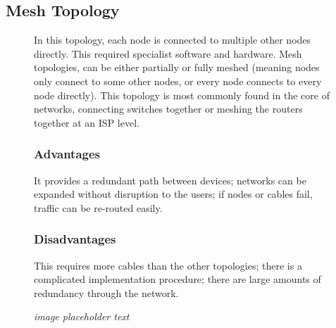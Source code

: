 \subsection*{Mesh Topology}
\begin{figure}[H]
    \begin{minipage}[H]{0.6\textwidth}
        In this topology, each node is connected to multiple other nodes directly. This required specialist software and hardware. Mesh topologies, can be either partially or fully meshed (meaning nodes only connect to some other nodes, or every node connects to every node directly). This topology is most commonly found in the core of networks, connecting switches together or meshing the routers together at an ISP level.
        \subsubsection*{Advantages}
        It provides a redundant path between devices; networks can be expanded without disruption to the users; if nodes or cables fail, traffic can be re-routed easily.
        \subsubsection*{Disadvantages}
        This requires more cables than the other topologies; there is a complicated implementation procedure; there are large amounts of redundancy through the network.
    \end{minipage}\hfill
    \begin{minipage}[H]{0.35\textwidth}
        \textit{image placeholder text}
    \end{minipage}\hfill
\end{figure}
